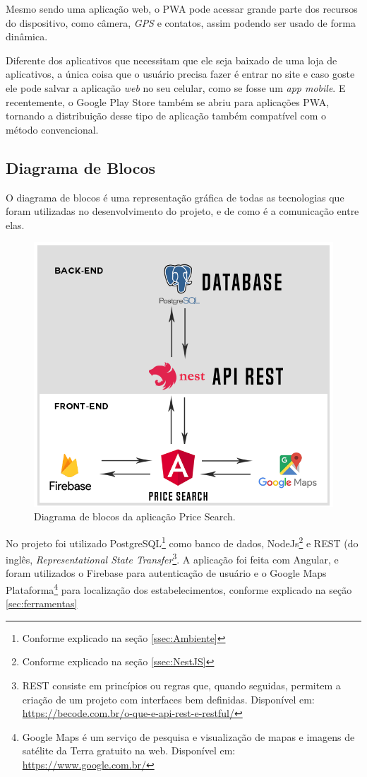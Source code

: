Mesmo sendo uma aplicação web, o PWA pode acessar grande parte dos recursos do dispositivo, como câmera, \textit{GPS} e contatos, assim podendo ser usado de forma dinâmica.

Diferente dos aplicativos que necessitam que ele seja baixado de uma loja de aplicativos, a única coisa que o usuário precisa fazer é entrar no site e caso goste ele pode salvar a aplicação \textit{web} no seu celular, como se fosse um \textit{app mobile}. E recentemente, o Google Play Store também se abriu para aplicações PWA, tornando a distribuição desse tipo de aplicação também compatível com o método convencional.


\subsection{Diagrama de Blocos}

 O diagrama de blocos é uma representação gráfica de todas as tecnologias que foram utilizadas no desenvolvimento do projeto, e de como é a comunicação entre elas.
 
\begin{figure}[!htb]
\centering
\includegraphics[width=\linewidth]{figuras/diagrama_de_blocos.png}
\caption{Diagrama de blocos da aplicação Price Search.}
\end{figure}
 
 No projeto foi utilizado PostgreSQL\footnote{Conforme explicado na seção \ref{ssec:Ambiente}} como banco de dados, NodeJs\footnote{Conforme explicado na seção \ref{ssec:NestJS}} e REST (do inglês, \textit{Representational State Transfer}\footnote{REST consiste em princípios ou regras que, quando seguidas, permitem a criação de um projeto com interfaces bem definidas. Disponível em: \url{https://becode.com.br/o-que-e-api-rest-e-restful/}}. A aplicação foi feita com Angular, e foram utilizados o Firebase para autenticação de usuário e o Google Maps Plataforma\footnote{Google Maps é um serviço de pesquisa e visualização de mapas e imagens de satélite da Terra gratuito na web. Disponível em: \url{https://www.google.com.br/}} para localização dos estabelecimentos, conforme explicado na seção \ref{sec:ferramentas}
 
